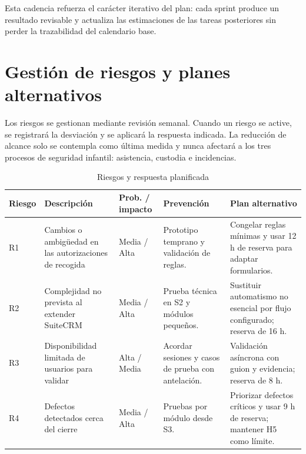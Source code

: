 Esta cadencia refuerza el carácter iterativo del plan: cada sprint produce un resultado revisable y actualiza las estimaciones de las tareas posteriores sin perder la trazabilidad del calendario base.

\section{Gestión de riesgos y planes alternativos}\label{sec:2-4}

Los riesgos se gestionan mediante revisión semanal. Cuando un riesgo se active, se registrará la desviación y se aplicará la respuesta indicada. La reducción de alcance solo se contempla como última medida y nunca afectará a los tres procesos de seguridad infantil: asistencia, custodia e incidencias.

\begin{table}[H]
\centering\footnotesize
\begin{tabularx}{\textwidth}{>{\hsize=0.500\hsize\raggedright\arraybackslash}X>{\hsize=1.195\hsize\raggedright\arraybackslash}X>{\hsize=0.575\hsize\raggedright\arraybackslash}X>{\hsize=1.087\hsize\raggedright\arraybackslash}X>{\hsize=1.643\hsize\raggedright\arraybackslash}X}
\toprule
\rowcolor{cabeceratabla} \textbf{Riesgo} & \textbf{Descripción} & \textbf{Prob. / impacto} & \textbf{Prevención} & \textbf{Plan alternativo} \\
\midrule
R1 & Cambios o ambigüedad en las autorizaciones de recogida & Media / Alta & Prototipo temprano y validación de reglas. & Congelar reglas mínimas y usar 12 h de reserva para adaptar formularios. \\
R2 & Complejidad no prevista al extender SuiteCRM & Media / Alta & Prueba técnica en S2 y módulos pequeños. & Sustituir automatismo no esencial por flujo configurado; reserva de 16 h. \\
R3 & Disponibilidad limitada de usuarios para validar & Alta / Media & Acordar sesiones y casos de prueba con antelación. & Validación asíncrona con guion y evidencia; reserva de 8 h. \\
R4 & Defectos detectados cerca del cierre & Media / Alta & Pruebas por módulo desde S3. & Priorizar defectos críticos y usar 9 h de reserva; mantener H5 como límite. \\
\bottomrule
\end{tabularx}
\caption{Riesgos y respuesta planificada}\label{tab:14}
\end{table}

